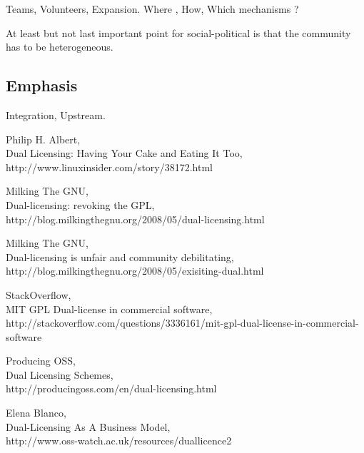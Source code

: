 \documentclass[11pt]{scrartcl}
\begin{document}
\par Teams, Volunteers, Expansion. Where , How, Which mechanisms ?

\par At least but not last important point for social-political is that the community has to be heterogeneous.


\subsection{Emphasis}
\label{sub:emphasis}

\par Integration, Upstream.


\begin{thebibliography}{9}

    Philip H. Albert,\\
    Dual Licensing: Having Your Cake and Eating It Too,\\
    http://www.linuxinsider.com/story/38172.html

    Milking The GNU,\\
    Dual-licensing: revoking the GPL,\\
    http://blog.milkingthegnu.org/2008/05/dual-licensing.html

    Milking The GNU,\\
    Dual-licensing is unfair and community debilitating,\\
    http://blog.milkingthegnu.org/2008/05/exisiting-dual.html

    StackOverflow,\\
    MIT GPL Dual-license in commercial software,\\
    http://stackoverflow.com/questions/3336161/mit-gpl-dual-license-in-commercial-software

    Producing OSS,\\
    Dual Licensing Schemes,\\
    http://producingoss.com/en/dual-licensing.html

    Elena Blanco,\\
    Dual-Licensing As A Business Model,\\
    http://www.oss-watch.ac.uk/resources/duallicence2


\end{thebibliography}
\end{document}
